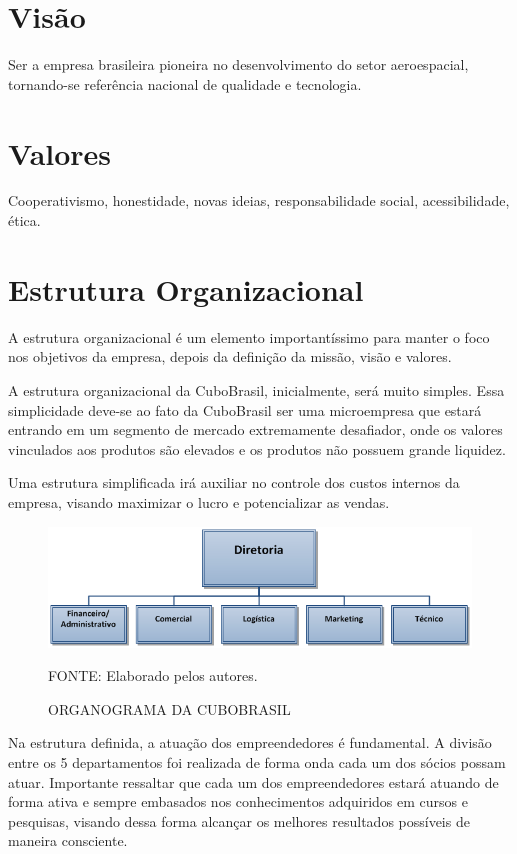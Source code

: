 \documentclass[
	12pt,				%
	openright,			%
	oneside,			%
	a4paper,			%
	english,			%
	french,				%
	spanish,			%
	brazil				%
	]{abntex2}
\begin{document}
\section[Visão]{Visão}	
	
	Ser a empresa brasileira pioneira no desenvolvimento do setor aeroespacial, tornando-se referência nacional de qualidade e tecnologia.
	
\section[Valores]{Valores}

	Cooperativismo, honestidade, novas ideias, responsabilidade social, acessibilidade, ética.

\section[Estrutura Organizacional]{Estrutura Organizacional}

	A estrutura organizacional é um elemento importantíssimo para manter o foco nos objetivos da empresa, depois da definição da missão, visão e valores.	
	
	A estrutura organizacional da CuboBrasil, inicialmente, será muito simples. Essa simplicidade deve-se ao fato da CuboBrasil ser uma microempresa que estará entrando em um segmento de mercado extremamente desafiador, onde os valores vinculados aos produtos são elevados e os produtos não possuem grande liquidez.
	
	Uma estrutura simplificada irá auxiliar no controle dos custos internos da empresa, visando maximizar o lucro e potencializar as vendas.
	
	\begin{figure}[th]
		\caption{ORGANOGRAMA DA CUBOBRASIL}
		\centering
		\includegraphics[width=1.0\linewidth]{./figs/Figura_10}
		
		\begin{small}
			FONTE: Elaborado pelos autores.
		\end{small}
	\end{figure}
	\pagebreak
	Na estrutura definida, a atuação dos empreendedores é fundamental. A divisão entre os 5 departamentos foi realizada de forma onda cada um dos sócios possam atuar. Importante ressaltar que cada um dos empreendedores estará atuando de forma ativa e sempre embasados nos conhecimentos adquiridos em cursos e pesquisas, visando dessa forma alcançar os melhores resultados possíveis de maneira consciente.
	
\end{document}

